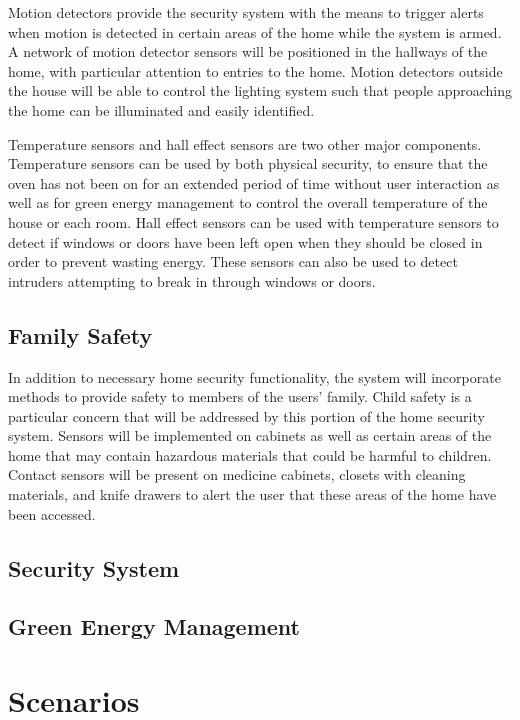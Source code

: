 \documentclass{report}
\begin{document}
Motion detectors provide the security system with the means to trigger alerts 
when motion is detected in certain areas of the home while the system is armed. 
A network of motion detector sensors will be positioned in the hallways of the home, 
with particular attention to entries to the home. Motion detectors outside the 
house will be able to control the lighting system such that people approaching the 
home can be illuminated and easily identified.

Temperature sensors and hall effect sensors are two other major components.
Temperature sensors can be used by both physical security, to ensure that the
oven has not been on for an extended period of time without user interaction as
well as for green energy management to control the overall temperature of the
house or each room. Hall effect sensors can be used with temperature sensors to
detect if windows or doors have been left open when they should be closed in
order to prevent wasting energy. These sensors can also be used to detect
intruders attempting to break in through windows or doors.

\subsection{Family Safety}

In addition to necessary home security functionality, the system will incorporate 
methods to provide safety to members of the users' family. Child safety is a particular 
concern that will be addressed by this portion of the home security system. Sensors 
will be implemented on cabinets as well as certain areas of the home that may contain 
hazardous materials that could be harmful to children. Contact sensors will be present 
on medicine cabinets, closets with cleaning materials, and knife drawers to alert the user
that these areas of the home have been accessed.

\subsection{Security System}

\subsection{Green Energy Management}



\section{Scenarios}
\end{document}
